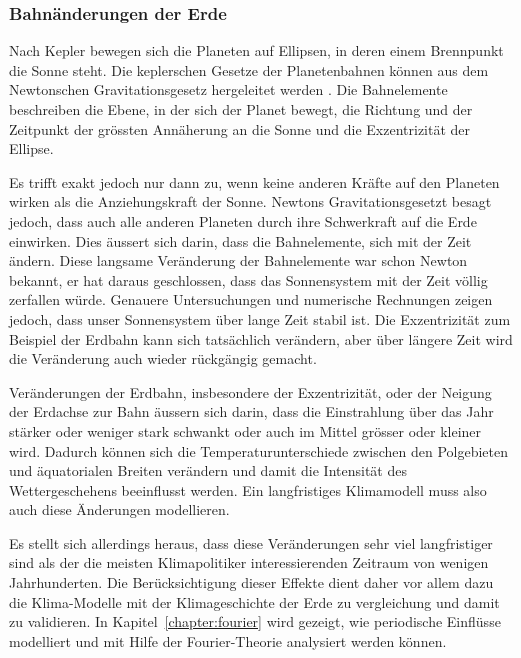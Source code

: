 \subsubsection{Bahnänderungen der Erde}
Nach Kepler bewegen sich die Planeten auf Ellipsen,
in deren einem Brennpunkt die Sonne steht.
Die keplerschen Gesetze der Planetenbahnen können aus dem Newtonschen 
Gravitationsgesetz hergeleitet werden
\cite[\S 6]{skript:joos}.
Die Bahnelemente beschreiben die Ebene, in der sich der Planet bewegt,
die Richtung und der Zeitpunkt der grössten Annäherung an die Sonne und
die Exzentrizität der Ellipse.

Es trifft exakt jedoch nur dann zu, wenn keine anderen Kräfte auf den
Planeten wirken als die Anziehungskraft der Sonne.
Newtons Gravitationsgesetzt besagt jedoch, dass auch alle anderen
Planeten durch ihre Schwerkraft auf die Erde einwirken.
Dies äussert sich darin, dass die Bahnelemente, sich mit der Zeit
ändern.
Diese langsame Veränderung der Bahnelemente war schon Newton bekannt,
er hat daraus geschlossen, dass das Sonnensystem mit der Zeit völlig
zerfallen würde.
Genauere Untersuchungen und numerische Rechnungen zeigen jedoch, dass
unser Sonnensystem über lange Zeit stabil ist.
Die Exzentrizität zum Beispiel der Erdbahn kann sich tatsächlich verändern,
aber über längere Zeit wird die Veränderung auch wieder rückgängig
gemacht.

Veränderungen der Erdbahn, insbesondere der Exzentrizität, oder der
Neigung der Erdachse zur Bahn äussern sich darin, dass die Einstrahlung
über das Jahr stärker oder weniger stark schwankt oder auch im Mittel
grösser oder kleiner wird.
Dadurch können sich die Temperaturunterschiede zwischen den Polgebieten und
äquatorialen Breiten verändern und damit die Intensität des Wettergeschehens
beeinflusst werden.
Ein langfristiges Klimamodell muss also auch diese Änderungen
modellieren.

Es stellt sich allerdings heraus, dass diese Veränderungen sehr viel
langfristiger sind als der die meisten Klimapolitiker interessierenden
Zeitraum von wenigen Jahrhunderten.
Die Berücksichtigung dieser Effekte dient daher vor allem dazu die
Klima-Modelle mit der Klimageschichte der Erde zu vergleichung und
damit zu validieren.
In Kapitel~\ref{chapter:fourier} wird gezeigt, wie periodische Einflüsse
modelliert und mit Hilfe der Fourier-Theorie analysiert werden können.

